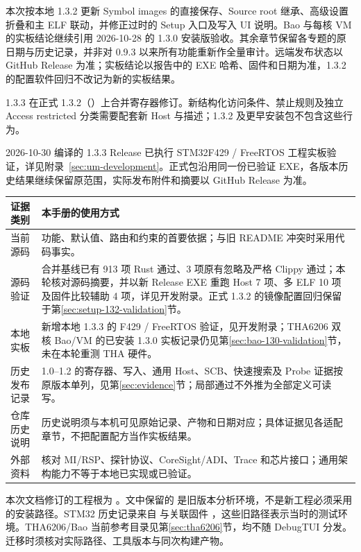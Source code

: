 \documentclass[UTF8,a4paper,11pt,oneside,fontset=none]{ctexart}
\newcommand{\code}[1]{\texttt{\detokenize{#1}}}
\begin{document}
本次按本地 1.3.2 更新 Symbol images 的直接保存、Source root 继承、高级设置折叠和主 ELF 联动，并修正过时的 Setup 入口及写入 UI 说明。Bao 与每核 VM 的实板结论继续引用 2026-10-28 的 1.3.0 安装版验收。其余章节保留各专题的原日期与历史记录，并非对 0.9.3 以来所有功能重新作全量审计。远端发布状态以 GitHub Release 为准；实板结论以报告中的 EXE 哈希、固件和日期为准，1.3.2 的配置软件回归不改记为新的实板结果。

1.3.3 在正式 1.3.2（\code{24959e5}）上合并寄存器修订。新结构化访问条件、禁止规则及独立 Access restricted 分类需要配套新 Host 与描述；1.3.2 及更早安装包不包含这些行为。

2026-10-30 编译的 1.3.3 Release 已执行 STM32F429 / FreeRTOS 工程实板验证，详见附录~\ref{sec:um-development}。正式包沿用同一份已验证 EXE，各版本历史结果继续保留原范围，实际发布附件和摘要以 GitHub Release 为准。

\noindent\begin{tabularx}{\linewidth}{@{}P{27mm}Y@{}}\toprule
证据类别 & 本手册的使用方式\\\midrule
当前源码 & 功能、默认值、路由和约束的首要依据；与旧 README 冲突时采用代码事实。\\
源码验证 & 合并基线已有 913 项 Rust 通过、3 项原有忽略及严格 Clippy 通过；本轮核对源码摘要，并以新 Release EXE 重跑 Host 7 项、多 ELF 10 项及固件比较辅助 4 项，详见开发附录。正式 1.3.2 的镜像配置回归保留于第\ref{sec:setup-132-validation}节。\\
本地实板 & 新增本地 1.3.3 的 F429 / FreeRTOS 验证，见开发附录；THA6206 双核 Bao/VM 的已安装 1.3.0 实板记录仍见第\ref{sec:bao-130-validation}节，未在本轮重测 THA 硬件。\\
历史发布记录 & 1.0--1.2 的寄存器、写入、通用 Host、SCB、快速搜索及 Probe 证据按原版本单列，见第\ref{sec:evidence}节；局部通过不外推为全部定义可读写。\\
仓库历史说明 & 历史说明须与本机可见原始记录、产物和日期对应；具体证据见各适配章节，不把配置配方当作实板结果。\\
外部资料 & 核对 MI/RSP、探针协议、CoreSight/ADI、Trace 和芯片接口；通用架构能力不等于本地已实现或已验证。\\\bottomrule
\end{tabularx}

本次文档修订的工程根为 。文中保留的  是旧版本分析环境，不是新工程必须采用的安装路径。STM32 历史记录来自  与关联固件 ，这些旧路径表示当时的测试环境。THA6206/Bao 当前参考目录见第\ref{sec:tha6206}节，均不随 DebugTUI 分发。迁移时须核对实际路径、工具版本与同次构建产物。
\end{document}
